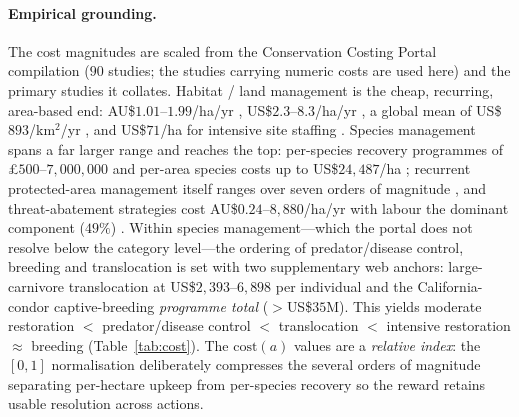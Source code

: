 \documentclass[11pt]{article}
\begin{document}
\paragraph{Empirical grounding.}
The cost magnitudes are scaled from the Conservation Costing Portal compilation
\cite{iaconaportal} ($90$ studies; the studies carrying numeric costs are used
here) and the primary studies it collates. Habitat / land management is the cheap,
recurring, area-based end: AU\$$1.01$--$1.99$/ha/yr \cite{adams2012}, US\$$2.3$--$8.3$/ha/yr
\cite{green2012}, a global mean of US\$$893$/km$^2$/yr \cite{james1999}, and
US\$$71$/ha for intensive site staffing \cite{frazee2003}. Species management spans a
far larger range and reaches the top: per-species recovery programmes of
\pounds$500$--$7{,}000{,}000$ \cite{laycock2009} and per-area species costs up to
US\$$24{,}487$/ha \cite{mccarthy2012}; recurrent protected-area management itself
ranges over seven orders of magnitude \cite{balmford2003}, and threat-abatement
strategies cost AU\$$0.24$--$8{,}880$/ha/yr with labour the dominant component
($49\%$) \cite{yong2023}. Within species management---which the portal does not
resolve below the category level---the ordering of predator/disease control,
breeding and translocation is set with two supplementary web anchors:
large-carnivore translocation at US\$$2{,}393$--$6{,}898$ per individual
\cite{weise2014} and the California-condor captive-breeding \emph{programme total}
($>$US\$$35$M). This yields
moderate restoration $<$ predator/disease control $<$ translocation $<$ intensive
restoration $\approx$ breeding (Table~\ref{tab:cost}). The $\mathrm{cost}(a)$ values
are a \emph{relative index}: the $[0,1]$ normalisation deliberately compresses the
several orders of magnitude separating per-hectare upkeep from per-species recovery
so the reward retains usable resolution across actions.
\end{document}
